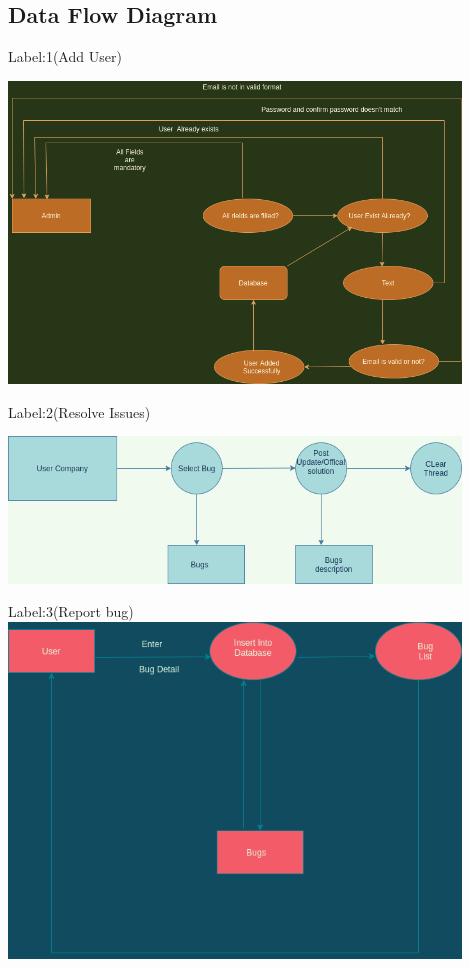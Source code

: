 \documentclass{article}
\begin{document}
\subsection{Data Flow Diagram}
Label:1(Add User)

\includegraphics[width=12cm]{flow}
 \vspace{10\baselineskip}
 
Label:2(Resolve Issues)
 
\includegraphics[width=12cm]{images/Resolve_issues.png}
\newpage


Label:3(Report bug)
\\
\includegraphics[width=12cm]{images/Report_bug.png}
\end{document}
